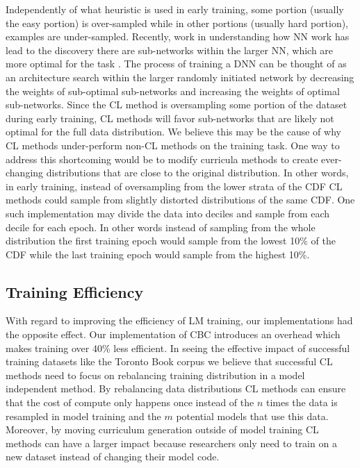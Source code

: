 Independently of what heuristic is used in early training, some portion (usually the easy portion) is over-sampled while in other portions (usually hard portion), examples are under-sampled. Recently, work in understanding how NN work has lead to the discovery there are sub-networks within the larger NN, which are more optimal for the task \cite{Frankle2019TheLT}. The process of training a DNN can be thought of as an architecture search within the larger randomly initiated network by decreasing the weights of sub-optimal sub-networks and increasing the weights of optimal sub-networks. Since the CL method is oversampling some portion of the dataset during early training, CL methods will favor sub-networks that are likely not optimal for the full data distribution. We believe this may be the cause of why CL methods under-perform non-CL methods on the training task. One way to address this shortcoming would be to modify curricula methods to create ever-changing distributions that are close to the original distribution. In other words, in early training, instead of oversampling from the lower strata of the CDF CL methods could sample from slightly distorted distributions of the same CDF. One such implementation may divide the data into deciles and sample from each decile for each epoch. In other words instead of sampling from the whole distribution the first training epoch would sample from the lowest 10\% of the CDF while the last training epoch would sample from the highest 10\%. 
\subsection{Training Efficiency}
With regard to improving the efficiency of LM training, our implementations had the opposite effect. Our implementation of CBC introduces an overhead which makes training over 40\% less efficient. In seeing the effective impact of successful training datasets like the Toronto Book corpus we believe that successful CL methods need to focus on rebalancing training distribution in a model independent method. By rebalancing data distributions CL methods can ensure that the cost of compute only happens once instead of the $n$ times the data is resampled in model training and the $m$  potential models that use this data. Moreover, by moving curriculum generation outside of model training CL methods can have a larger impact because researchers only need to train on a new dataset instead of changing their model code. \\
